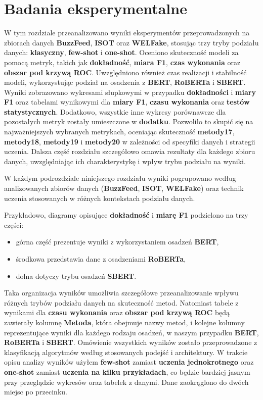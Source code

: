 \chapter{Badania eksperymentalne}\label{chapt:testsResults}
W tym rozdziale przeanalizowano wyniki eksperymentów przeprowadzonych na zbiorach danych \textbf{BuzzFeed}, \textbf{ISOT} oraz \textbf{WELFake}, stosując trzy tryby podziału danych: \textbf{klasyczny}, \textbf{few-shot} i \textbf{one-shot}. Oceniono skuteczność modeli za pomocą metryk, takich jak \textbf{dokładność}, \textbf{miara F1}, \textbf{czas wykonania} oraz \textbf{obszar pod krzywą ROC}. Uwzględniono również czas realizacji i stabilność modeli, wykorzystując podział na osadzenia z \textbf{BERT}, \textbf{RoBERTa} i \textbf{SBERT}. Wyniki zobrazowano wykresami słupkowymi w przypadku \textbf{dokładności} i \textbf{miary F1} oraz tabelami wynikowymi dla \textbf{miary F1}, \textbf{czasu wykonania} oraz \textbf{testów statystycznych}. Dodatkowo, wszystkie inne wykresy porównawcze dla pozostałych metryk zostały umieszczone w \textbf{dodatku}. Pozwoliło to skupić się na najważniejszych wybranych metrykach, oceniając skuteczność \textbf{metody17}, \textbf{metody18}, \textbf{metody19} i \textbf{metody20} w zależności od specyfiki danych i strategii uczenia. Dalsza część rozdziału szczegółowo omawia rezultaty dla każdego zbioru danych, uwzględniając ich charakterystykę i wpływ trybu podziału na wyniki.

W każdym podrozdziale niniejszego rozdziału wyniki pogrupowano według analizowanych zbiorów danych (\textbf{BuzzFeed}, \textbf{ISOT}, \textbf{WELFake}) oraz technik uczenia stosowanych w różnych kontekstach podziału danych.

Przykładowo, diagramy opisujące \textbf{dokładność} i \textbf{miarę F1} podzielono na trzy części:
\begin{itemize}
	\item górna część prezentuje wyniki z wykorzystaniem osadzeń \textbf{BERT},
	\item środkowa przedstawia dane z osadzeniami \textbf{RoBERTa},
	\item dolna dotyczy trybu osadzeń \textbf{SBERT}.
\end{itemize}

Taka organizacja wyników umożliwia szczegółowe przeanalizowanie wpływu różnych trybów podziału danych na skuteczność metod. Natomiast tabele z wynikami dla \textbf{czasu wykonania} oraz \textbf{obszar pod krzywą ROC} będą zawierały kolumnę \textbf{Metoda}, która obejmuje nazwy metod, i kolejne kolumny reprezentujące wyniki dla każdego rodzaju osadzeń, w naszym przypadku \textbf{BERT}, \textbf{RoBERTa} i \textbf{SBERT}. Omówienie wszystkich wyników zostało przeprowadzone z klasyfikacją algorytmów według stosowanych podejść i architektury. W trakcie opisu analizy wyników użyłem \textbf{few-shot} zamiast \textbf{uczenia jednokrotnego} oraz \textbf{one-shot} zamiast \textbf{uczenia na kilku przykładach}, co będzie bardziej jasnym przy przeglądzie wykresów oraz tabelek z danymi. Dane zaokrąglono do dwóch miejsc po przecinku.




